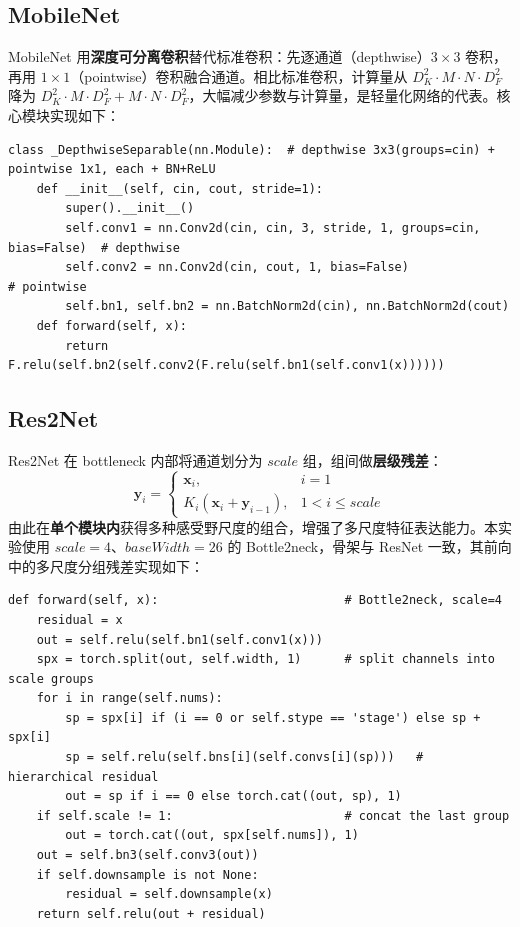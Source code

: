 \documentclass[a4paper]{article}
\begin{document}
\subsection{MobileNet}
MobileNet 用\textbf{深度可分离卷积}替代标准卷积：先逐通道（depthwise）$3\times3$ 卷积，再用 $1\times1$（pointwise）卷积融合通道。相比标准卷积，计算量从 $D_K^2\cdot M\cdot N\cdot D_F^2$ 降为 $D_K^2\cdot M\cdot D_F^2 + M\cdot N\cdot D_F^2$，大幅减少参数与计算量，是轻量化网络的代表。核心模块实现如下：
\begin{lstlisting}
class _DepthwiseSeparable(nn.Module):  # depthwise 3x3(groups=cin) + pointwise 1x1, each + BN+ReLU
    def __init__(self, cin, cout, stride=1):
        super().__init__()
        self.conv1 = nn.Conv2d(cin, cin, 3, stride, 1, groups=cin, bias=False)  # depthwise
        self.conv2 = nn.Conv2d(cin, cout, 1, bias=False)                        # pointwise
        self.bn1, self.bn2 = nn.BatchNorm2d(cin), nn.BatchNorm2d(cout)
    def forward(self, x):
        return F.relu(self.bn2(self.conv2(F.relu(self.bn1(self.conv1(x))))))
\end{lstlisting}

\subsection{Res2Net}
Res2Net 在 bottleneck 内部将通道划分为 $scale$ 组，组间做\textbf{层级残差}：
\begin{equation}
  \bm{y}_i =
  \begin{cases}
    \bm{x}_i, & i=1\\
    K_i(\bm{x}_i + \bm{y}_{i-1}), & 1<i\le scale
  \end{cases}
\end{equation}
由此在\textbf{单个模块内}获得多种感受野尺度的组合，增强了多尺度特征表达能力。本实验使用 $scale=4$、$baseWidth=26$ 的 Bottle2neck，骨架与 ResNet 一致，其前向中的多尺度分组残差实现如下：
\begin{lstlisting}
def forward(self, x):                          # Bottle2neck, scale=4
    residual = x
    out = self.relu(self.bn1(self.conv1(x)))
    spx = torch.split(out, self.width, 1)      # split channels into scale groups
    for i in range(self.nums):
        sp = spx[i] if (i == 0 or self.stype == 'stage') else sp + spx[i]
        sp = self.relu(self.bns[i](self.convs[i](sp)))   # hierarchical residual
        out = sp if i == 0 else torch.cat((out, sp), 1)
    if self.scale != 1:                        # concat the last group
        out = torch.cat((out, spx[self.nums]), 1)
    out = self.bn3(self.conv3(out))
    if self.downsample is not None:
        residual = self.downsample(x)
    return self.relu(out + residual)
\end{lstlisting}
\end{document}
